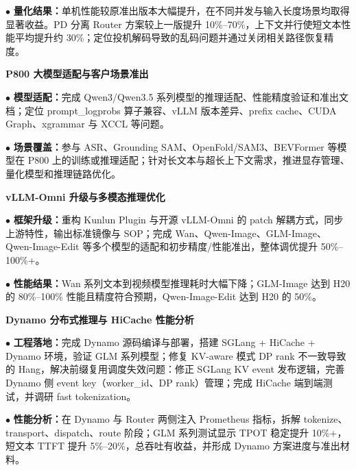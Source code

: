 \documentclass[11pt,a4paper,fontset=none]{ctexart}
\newcommand{\entrytitle}[1]{{\textbf{#1}}}
\begin{document}
\par\noindent
$\bullet$ \textbf{量化结果：}单机性能较原准出版本大幅提升，在不同并发与输入长度场景均取得显著收益。PD 分离 Router 方案较上一版提升 10\%--70\%，上下文并行使短文本性能平均提升约 30\%；定位投机解码导致的乱码问题并通过关闭相关路径恢复精度。

\par\noindent
\entrytitle{P800 大模型适配与客户场景准出}

\par\noindent
$\bullet$ \textbf{模型适配：}完成 Qwen3/Qwen3.5 系列模型的推理适配、性能精度验证和准出文档；定位 prompt\_logprobs 算子兼容、vLLM 版本差异、prefix cache、CUDA Graph、xgrammar 与 XCCL 等问题。

\par\noindent
$\bullet$ \textbf{场景覆盖：}参与 ASR、Grounding SAM、OpenFold/SAM3、BEVFormer 等模型在 P800 上的训练或推理适配；针对长文本与超长上下文需求，推进显存管理、量化模型和推理链路优化。

\par\noindent
\entrytitle{vLLM-Omni 升级与多模态推理优化}

\par\noindent
$\bullet$ \textbf{框架升级：}重构 Kunlun Plugin 与开源 vLLM-Omni 的 patch 解耦方式，同步上游特性，输出标准镜像与 SOP；完成 Wan、Qwen-Image、GLM-Image、Qwen-Image-Edit 等多个模型的适配和初步精度/性能准出，整体调优提升 50\%--100\%+。

\par\noindent
$\bullet$ \textbf{性能结果：}Wan 系列文本到视频模型推理耗时大幅下降；GLM-Image 达到 H20 的 80\%--100\% 性能且精度符合预期，Qwen-Image-Edit 达到 H20 的 50\%。

\par\noindent
\newpage
\entrytitle{Dynamo 分布式推理与 HiCache 性能分析}

\par\noindent
$\bullet$ \textbf{工程落地：}完成 Dynamo 源码编译与部署，搭建 SGLang + HiCache + Dynamo 环境，验证 GLM 系列模型；修复 KV-aware 模式 DP rank 不一致导致的 Hang，解决前缀复用调度失效问题：修正 SGLang KV event 发布逻辑，完善 Dynamo 侧 event key（worker\_id、DP rank）管理；完成 HiCache 端到端测试，并调研 fast tokenization。

\par\noindent
$\bullet$ \textbf{性能分析：}在 Dynamo 与 Router 两侧注入 Prometheus 指标，拆解 tokenize、transport、dispatch、route 阶段；GLM 系列测试显示 TPOT 稳定提升 10\%+，短文本 TTFT 提升 5\%--20\%，总吞吐有收益，并形成 Dynamo 方案进度与准出材料。
\end{document}
